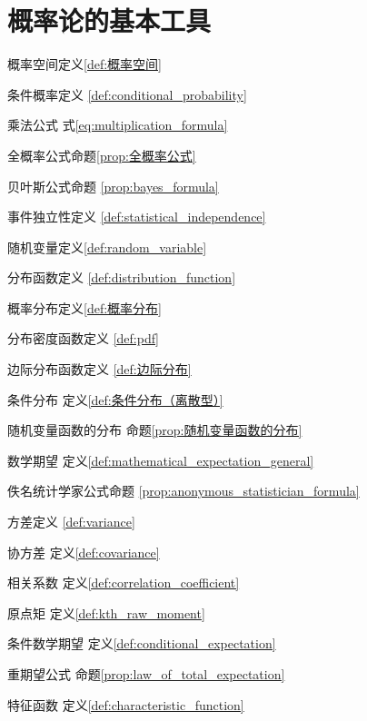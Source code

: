 \chapter{概率论的基本工具}\label{chap:概率论的基本工具}
\begin{introduction}
        \item 概率空间\quad 定义\ref{def:概率空间}
        \item 条件概率\quad 定义 \ref{def:conditional_probability}
        \item 乘法公式 \quad 式\ref{eq:multiplication_formula}
        \item 全概率公式\quad 命题\ref{prop:全概率公式}
        \item 贝叶斯公式\quad 命题 \ref{prop:bayes_formula}
        \item 事件独立性\quad 定义 \ref{def:statistical_independence}
        \item 随机变量\quad 定义\ref{def:random_variable}
        \item 分布函数\quad 定义 \ref{def:distribution_function}
        \item 概率分布\quad 定义\ref{def:概率分布}
        \item 分布密度函数\quad 定义 \ref{def:pdf}
        \item 边际分布函数\quad 定义 \ref{def:边际分布}
        \item 条件分布 \quad 定义\ref{def:条件分布（离散型）}
        \item 随机变量函数的分布 \quad  命题\ref{prop:随机变量函数的分布}
        \item 数学期望 \quad 定义\ref{def:mathematical_expectation_general}
        \item 佚名统计学家公式\quad 命题 \ref{prop:anonymous_statistician_formula}
        \item 方差\quad 定义 \ref{def:variance}
        \item 协方差 \quad 定义\ref{def:covariance}
        \item 相关系数 \quad 定义\ref{def:correlation_coefficient}
        \item 原点矩 \quad 定义\ref{def:kth_raw_moment}
        \item 条件数学期望 \quad 定义\ref{def:conditional_expectation}
        \item 重期望公式  \quad 命题\ref{prop:law_of_total_expectation}
        \item 特征函数 \quad 定义\ref{def:characteristic_function}
\end{introduction}
